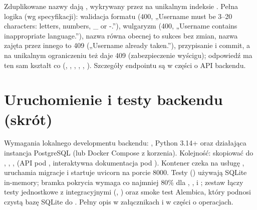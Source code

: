 Zduplikowane nazwy dają , wykrywany przez  na
unikalnym indeksie . Pełna logika  (wg
specyfikacji): walidacja formatu (400, „Username must be 3--20 characters: letters,
numbers, \_ or -.”), wulgaryzm (400, „Username contains inappropriate language.”),
nazwa równa obecnej to sukces bez zmian, nazwa zajęta przez innego to 409 („Username
already taken.”), przypisanie i commit, a  na unikalnym ograniczeniu
też daje 409 (zabezpieczenie wyścigu); odpowiedź ma ten sam kształt co 
(, , , , ,
). Szczegóły endpointu są w części o API backendu.

\section{Uruchomienie i testy backendu (skrót)}
\label{sec:dane-uruchomienie}

Wymagania lokalnego developmentu backendu: , Python 3.14+ oraz działająca
instancja PostgreSQL (lub Docker Compose z korzenia). Kolejność: skopiować
 do , , ,
 (API pod , interaktywna
dokumentacja pod ). Kontener czeka na usługę , uruchamia migracje i
startuje uvicorn na porcie 8000. Testy () używają SQLite in-memory;
bramka pokrycia wymaga co najmniej 80\% dla , ,
 i ; zestaw łączy testy jednostkowe z integracyjnymi
(, ) oraz smoke test Alembica, który podnosi
czystą bazę SQLite do . Pełny opis w załącznikach i w części o operacjach.

